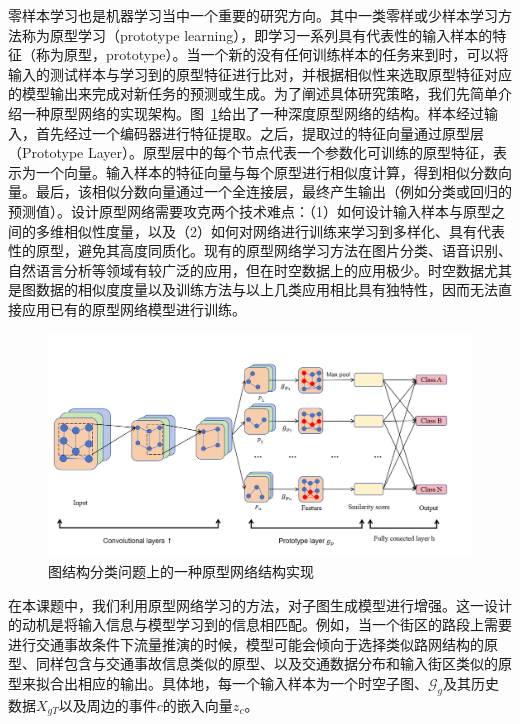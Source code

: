 \documentclass[12pt,UTF8,AutoFakeBold=2,a4paper]{ctexart} %
\begin{document}
零样本学习也是机器学习当中一个重要的研究方向。其中一类零样或少样本学习方法称为原型学习（prototype learning），即学习一系列具有代表性的输入样本的特征（称为原型，prototype）。当一个新的没有任何训练样本的任务来到时，可以将输入的测试样本与学习到的原型特征进行比对，并根据相似性来选取原型特征对应的模型输出来完成对新任务的预测或生成。为了阐述具体研究策略，我们先简单介绍一种原型网络的实现架构。图~\ref{fig:proto-graph}给出了一种深度原型网络的结构。样本经过输入，首先经过一个编码器进行特征提取。之后，提取过的特征向量通过原型层（Prototype Layer）。原型层中的每个节点代表一个参数化可训练的原型特征，表示为一个向量。输入样本的特征向量与每个原型进行相似度计算，得到相似分数向量。最后，该相似分数向量通过一个全连接层，最终产生输出（例如分类或回归的预测值）。设计原型网络需要攻克两个技术难点：（1）如何设计输入样本与原型之间的多维相似性度量，以及（2）如何对网络进行训练来学习到多样化、具有代表性的原型，避免其高度同质化。现有的原型网络学习方法在图片分类、语音识别、自然语言分析等领域有较广泛的应用，但在时空数据上的应用极少。时空数据尤其是图数据的相似度度量以及训练方法与以上几类应用相比具有独特性，因而无法直接应用已有的原型网络模型进行训练。
\begin{figure}
    \centering
    \includegraphics[width=0.9\linewidth]{fig/proto-graph-new.png}
    \caption{图结构分类问题上的一种原型网络结构实现}
    \label{fig:proto-graph}
\end{figure}
在本课题中，我们利用原型网络学习的方法，对子图生成模型进行增强。这一设计的动机是将输入信息与模型学习到的信息相匹配。例如，当一个街区的路段上需要进行交通事故条件下流量推演的时候，模型可能会倾向于选择类似路网结构的原型、同样包含与交通事故信息类似的原型、以及交通数据分布和输入街区类似的原型来拟合出相应的输出。具体地，每一个输入样本为一个时空子图$、\mathcal{G}_g$及其历史数据${X}_{gT}$以及周边的事件$c$的嵌入向量$z_c$。%
\end{document}
